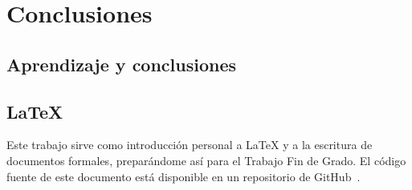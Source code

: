 \chapter{Conclusiones}
\section{Aprendizaje y conclusiones}

\section{\LaTeX}
Este trabajo sirve como introducción personal a \LaTeX{} y a la escritura de documentos formales, preparándome así para el Trabajo Fin de Grado.
El código fuente de este documento está disponible en un repositorio de GitHub~\cite{source}.

